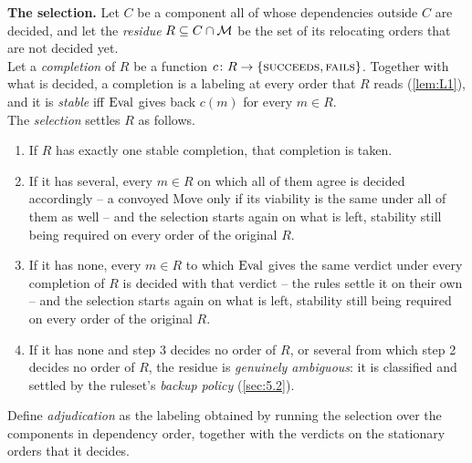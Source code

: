 \documentclass[12pt,a4paper]{article}
\begin{document}
\textbf{The selection.}
Let $C$ be a component all of whose dependencies outside $C$ are decided, and let the \emph{residue} $R \subseteq C \cap \mathcal{M}$ be the set of its relocating orders that are not decided yet.\\
Let a \emph{completion} of $R$ be a function $c\colon R \to \{\textsc{succeeds}, \textsc{fails}\}$.
Together with what is decided, a completion is a labeling at every order that $R$ reads (\cref{lem:L1}), and it is \emph{stable} iff $\operatorname{Eval}$ gives back $c(m)$ for every $m \in R$.\\
The \emph{selection} settles $R$ as follows.
\begin{enumerate}
\item If $R$ has exactly one stable completion, that completion is taken.
\item If it has several, every $m \in R$ on which all of them agree is decided accordingly -- a convoyed Move only if its viability is the same under all of them as well -- and the selection starts again on what is left, stability still being required on every order of the original $R$.
\item If it has none, every $m \in R$ to which $\operatorname{Eval}$ gives the same verdict under every completion of $R$ is decided with that verdict -- the rules settle it on their own -- and the selection starts again on what is left, stability still being required on every order of the original $R$.
\item If it has none and step 3 decides no order of $R$, or several from which step 2 decides no order of $R$, the residue is \emph{genuinely ambiguous}: it is classified and settled by the ruleset's \emph{backup policy} (\cref{sec:5.2}).
\end{enumerate}
Define \emph{adjudication} as the labeling obtained by running the selection over the components in dependency order, together with the verdicts on the stationary orders that it decides.
\end{document}
